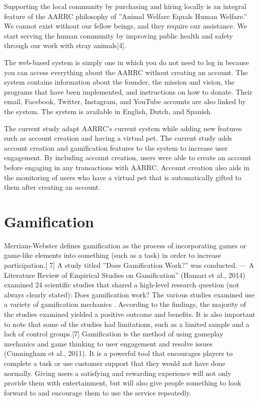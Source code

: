 Supporting the local community by purchasing and hiring locally is an integral
feature of the AARRC philosophy of ”Animal Welfare Equals Human Welfare.”
We cannot exist without our fellow beings, and they require our assistance. We
start serving the human community by improving public health and safety through
our work with stray animals[4].

The web-based system is simply one in which you do not need to log in because
you can access everything about the AARRC without creating an account. The system contains information about the founder, the mission and vision, the
programs that have been implemented, and instructions on how to donate. Their
email, Facebook, Twitter, Instagram, and YouTube accounts are also linked by
the system. The system is available in English, Dutch, and Spanish.

The current study adapt AARRC’s current system while adding new
features such as account creation and having a virtual pet. The current study
adds account creation and gamification features to the system to increase
user engagement. By including account creation, users  were able to create an
account before engaging in any transactions with AARRC. Account creation also
aids in the monitoring of users who have a virtual pet that is automatically gifted
to them after creating an account.

\section{Gamification}

Merriam-Webster defines gamification as the process of incorporating games
or game-like elements into something (such as a task) in order to increase participation.[
7] A study titled ”Does Gamification Work?” was conducted. — A
Literature Review of Empirical Studies on Gamification” (Hamari et al., 2014)
examined 24 scientific studies that shared a high-level research question (not always
clearly stated): Does gamification work? The various studies examined use
a variety of gamification mechanics . According to the findings, the majority of
the studies examined yielded a positive outcome and benefits. It is also important
to note that some of the studies had limitations, such as a limited sample and a
lack of control groups.[7]
Gamification is the method of using gameplay mechanics and game thinking
to user engagement and resolve issues (Cunningham et al., 2011). It is a powerful
tool that encourages players to complete a task or use customer support that they
would not have done normally. Giving users a satisfying and rewarding experience
will not only provide them with entertainment, but will also give people something
to look forward to and encourage them to use the service repeatedly.

